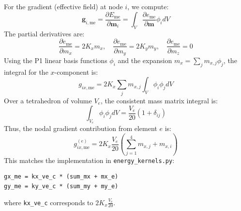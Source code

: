 \documentclass[11pt]{article}
\begin{document}
For the gradient (effective field) at node $i$, we compute:
\begin{equation}
    \mathbf{g}_{i,\text{me}} = \frac{\partial E_{\text{me}}}{\partial \mathbf{m}_i} = \int_V \frac{\partial e_{\text{me}}}{\partial \mathbf{m}} \phi_i dV
\end{equation}
The partial derivatives are:
\begin{equation}
    \frac{\partial e_{\text{me}}}{\partial m_x} = 2 K_x m_x, \quad \frac{\partial e_{\text{me}}}{\partial m_y} = 2 K_y m_y, \quad \frac{\partial e_{\text{me}}}{\partial m_z} = 0
\end{equation}
Using the P1 linear basis functions $\phi_i$ and the expansion $m_x = \sum_j m_{x,j} \phi_j$, the integral for the $x$-component is:
\begin{equation}
    g_{ix,\text{me}} = 2 K_x \sum_j m_{x,j} \int_V \phi_i \phi_j dV
\end{equation}
Over a tetrahedron of volume $V_e$, the consistent mass matrix integral is:
\begin{equation}
    \int_{V_e} \phi_i \phi_j dV = \frac{V_e}{20} (1 + \delta_{ij})
\end{equation}
Thus, the nodal gradient contribution from element $e$ is:
\begin{equation}
    g_{ix,\text{me}}^{(e)} = 2 K_x \frac{V_e}{20} \left( \sum_{j=1}^4 m_{x,j} + m_{x,i} \right)
\end{equation}
This matches the implementation in \texttt{energy\_kernels.py}:
\begin{verbatim}
gx_me = kx_ve_c * (sum_mx + mx_e)
gy_me = ky_ve_c * (sum_my + my_e)
\end{verbatim}
where \texttt{kx\_ve\_c} corresponds to $2 K_x \frac{V_e}{20}$.
\end{document}
